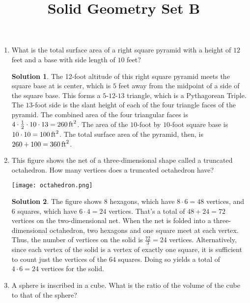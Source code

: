 \documentclass{article}
\title{Solid Geometry Set B}
\author{}
\date{}
\theoremstyle{definition}
\newtheorem*{solution}{Solution}
\begin{document}
\maketitle
\begin{multicols}{2}
    \begin{enumerate}
        \item What is the total surface area of a right square pyramid with a height of $12$ feet and a base with side length of $10$ feet?
        \begin{solution}
            The 12-foot altitude of this right square pyramid meets the square base at is center, which is $5$ feet away from the midpoint of a side of the square base.
            This forms a $5$-$12$-$13$ triangle, which is a Pythagorean Triple. The $13$-foot side is the slant height of each of the four triangle faces of the pyramid.
            The combined area of the four triangular faces is $4 \cdot \frac{1}{2} \cdot 10 \cdot 13 = \SI{260}{ft\squared}$.
            The area of the $10$-foot by $10$-foot square base is $10 \cdot 10 = \SI{100}{ft\squared}$.
            The total surface area of the pyramid, then, is $260 + 100 = \SI{360}{ft\squared}$.
        \end{solution}
        \item This figure shows the net of a three-dimensional shape called a truncated octahedron.
        How many vertices does a truncated octahedron have?
        \begin{center}
            \texttt{[image: octahedron.png]}
        \end{center}
        \begin{solution}
            The figure shows $8$ hexagons, which have $8 \cdot 6 = 48$ vertices, and $6$ squares, which have $6 \cdot 4 = 24$ vertices.
            That's a total of $48 + 24 = 72$ vertices on the two-dimensional net.
            When the net is folded into a three-dimensional octahedron, two hexagons and one square meet at each vertex.
            Thus, the number of vertices on the solid is $\frac{72}{3} = 24$ vertices.
            Alternatively, since each vertex of the solid is a vertex of exactly one square, it is sufficient to count just the vertices of the $64$ squares.
            Doing so yields a total of $4 \cdot 6 = 24$ vertices for the solid.
        \end{solution}
        \item A sphere is inscribed in a cube.
        What is the ratio of the volume of the cube to that of the sphere?

\end{enumerate}
\end{multicols}
\end{document}

